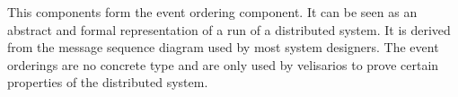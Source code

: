 This components form the event ordering component. It can be seen
as an abstract and formal representation of a run of a distributed system.
It is derived from the message sequence diagram used by most system designers.
The event orderings are no concrete type and are only used by velisarios
to prove certain properties of the distributed system.~\cite{rahli2018velisarios}






